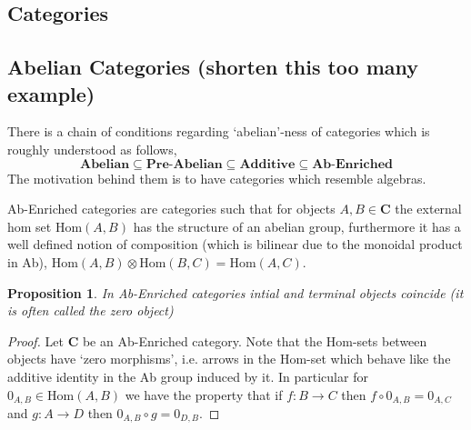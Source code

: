 \documentclass[12pt]{article}
\numberwithin{equation}{section}
\newcommand{\Hom}{{\mathrm{Hom}}}
\newtheorem{proposition}{Proposition}[section]
\begin{document}
\begin{appendices}
	\section{Categories}
	\subsection{Abelian Categories (shorten this too many example)}
	There is a chain of conditions regarding `abelian'-ness of categories which is roughly understood as follows,
	\[ \textbf{Abelian} \subseteq \textbf{Pre-Abelian} \subseteq \textbf{Additive} \subseteq \textbf{Ab-Enriched}\]
	The motivation behind them is to have categories which resemble algebras.
	
	Ab-Enriched categories are categories such that for objects $A,B \in \mathbf{C}$ the external hom set $\Hom(A,B)$ has the structure of an abelian group, furthermore it has a well defined notion of composition (which is bilinear due to the monoidal product in Ab), $\Hom(A,B)\otimes \Hom(B,C) =\Hom(A,C)$. 
	\begin{proposition}
		In Ab-Enriched categories intial and terminal objects coincide (it is often called the zero object)
	\end{proposition}
	\begin{proof}
		Let $\mathbf{C}$ be an Ab-Enriched category. Note that the Hom-sets between objects have `zero morphisms', i.e. arrows in the Hom-set which behave like the additive identity in the Ab group induced by it. In particular for $0_{A,B}\in \Hom(A,B)$ we have the property that if $f:B \to C$ then $f\circ 0_{A,B}=0_{A,C}$ and $g: A \to D$ then $0_{A,B}\circ g=0_{D,B}$.
		

\end{proof}
\end{appendices}
\end{document}
